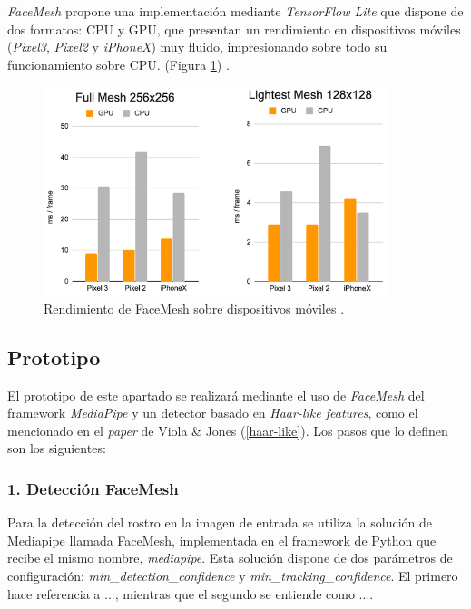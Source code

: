 \textit{FaceMesh} propone una implementación mediante \textit{TensorFlow Lite} que dispone de dos formatos: CPU y GPU, que presentan un rendimiento en dispositivos móviles (\textit{Pixel3}, \textit{Pixel2} y \textit{iPhoneX}) muy fluido, impresionando sobre todo su funcionamiento sobre CPU. (Figura \ref{fig:faceMeshRen}) \cite{faceMesh3}.

\begin{figure}[htp]
	\centering
	\includegraphics[width=10cm]{imagenes/rendFaceMesh.png}
	\caption{Rendimiento de FaceMesh sobre dispositivos móviles \cite{faceMesh3}.}
	\label{fig:faceMeshRen}
\end{figure}

\vspace{-0.8cm}
\subsection*{Prototipo}
\vspace{-0.5cm}
El prototipo de este apartado se realizará mediante el uso de \textit{FaceMesh} del framework \textit{MediaPipe} y un detector basado en \textit{Haar-like features}, como el mencionado en el \textit{paper} de Viola \& Jones (\ref{haar-like}). Los pasos que lo definen son los siguientes:

\vspace{-0.5cm}
\subsubsection*{1. Detección FaceMesh}
\vspace{-0.7cm}
Para la detección del rostro en la imagen de entrada se utiliza la solución de Mediapipe llamada FaceMesh, implementada en el framework de Python que recibe el mismo nombre, \textit{mediapipe}. Esta solución dispone de dos parámetros de configuración: \textit{min\_detection\_confidence} y \textit{min\_tracking\_confidence}. El primero hace referencia a ..., mientras que el segundo se entiende como ....

